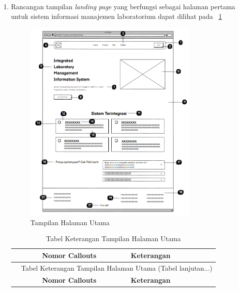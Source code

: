 \begin{enumerate}
	\item Rancangan tampilan \textit{landing page} yang berfungsi sebagai halaman pertama untuk sistem informasi manajemen laboratorium dapat dilihat pada \pic~\ref{fig:kelola-jadwal-1}
	      \begin{figure}
		      \centering
		      \includegraphics[width=0.82\textwidth]{konten/gambar/landing-page.png}
		      \caption{Tampilan Halaman Utama}
		      \label{fig:kelola-jadwal-1}
	      \end{figure}

	      \begin{longtable}{c p{}}
		      \caption{Tabel Keterangan Tampilan Halaman Utama}                                                                                               \\
		      \hline
		      \textbf{Nomor Callouts} & \textbf{Keterangan}                                                                                                   \\
		      \hline
		      \endfirsthead

		      \multicolumn{2}{c}{\small\tablename\ \thetable\ {Tabel Keterangan Tampilan Halaman Utama} \space (Tabel lanjutan...)}                           \\
		      \hline
		      \textbf{Nomor Callouts} & \textbf{Keterangan}                                                                                                   \\
		      \hline
		      \endhead


\end{longtable}
\end{enumerate}
